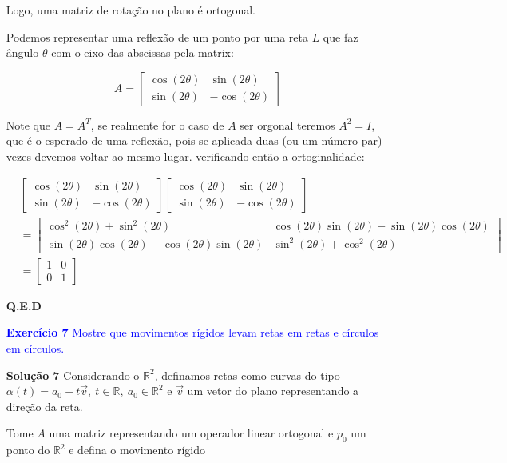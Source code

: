 \documentclass[12pt,letterpaper]{article}
\newcommand{\real}{\mathbb{R}}
\newcommand{\rr}{\mathbb{R}^2}
\newcommand{\ex}[1]{\textcolor{blue}{\textbf{Exercício #1}}}
\newcommand{\sol}[1]{\textbf{Solução #1}}
\begin{document}
\begin{enumerate}
	Logo, uma matriz de rotação no plano é ortogonal.
	
	Podemos representar uma reflexão de um ponto por uma reta $L$ que faz ângulo $\theta$ com o eixo das abscissas pela matrix\cite{wiki:Rotations_and_reflections_in_two_dimensions}: 
	
	$$A=\begin{bmatrix}
		\cos(2\theta)&\sin(2\theta)\\
		\sin(2\theta)&-\cos(2\theta)
	\end{bmatrix}$$

	Note que $A=A^T$, se realmente for o caso de $A$ ser orgonal teremos $A^2=I$, que é o esperado de uma reflexão, pois se aplicada duas (ou um número par) vezes devemos voltar ao mesmo lugar. verificando então a ortoginalidade:
	
	\begin{align*}
		&\begin{bmatrix}
			\cos(2\theta)&\sin(2\theta)\\
			\sin(2\theta)&-\cos(2\theta)
		\end{bmatrix}\begin{bmatrix}
		\cos(2\theta)&\sin(2\theta)\\
		\sin(2\theta)&-\cos(2\theta)
	\end{bmatrix}\\
	&=\begin{bmatrix}
		\cos^2 (2\theta) +\sin^2(2\theta)&\cos(2\theta)\sin(2\theta)-\sin(2\theta)\cos(2\theta)\\
		\sin(2\theta)\cos(2\theta)-\cos(2\theta)\sin(2\theta) &\sin^2(2\theta)+\cos^2(2\theta)
	\end{bmatrix}\\&=\begin{bmatrix}
		1 &0\\
		0 &1
	\end{bmatrix}
	\end{align*} 

	\textbf{Q.E.D}


	
	\item[\ex{7}]\textcolor{blue}{Mostre que movimentos rígidos levam retas em retas e círculos em círculos.}
	
	\item[\sol{7}] Considerando o $\rr$, definamos retas como curvas do tipo $\alpha(t)=a_0+t\vec v,~t\in\real,~a_0\in\rr$ e $\vec v$ um vetor do plano representando a direção da reta.
	
	Tome $A$ uma matriz representando um operador linear ortogonal e $p_0$ um ponto do $\rr$ e defina o movimento rígido
	

\end{enumerate}
\end{document}
